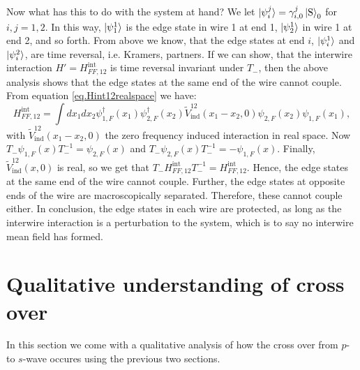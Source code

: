 Now what has this to do with the system at hand? We let $\ket{\psi_{i}^{j}} = \gamma_{i,0}^{j}\ket{\text{S}}_0$ for $i, j = 1, 2$. In this way, $\ket{\psi_{1}^1}$ is the edge state in wire 1 at end 1, $\ket{\psi_{2}^1}$ in wire 1 at end 2, and so forth. From above we know, that the edge states at end $i$, $\ket{\psi_{i}^1}$ and $\ket{\psi_{i}^2}$, are time reversal, i.e. Kramers, partners. If we can show, that the interwire interaction $H' = H^\text{int}_{FF,12}$ is time reversal invariant under $T_-$, then the above analysis shows that the edge states at the same end of the wire cannot couple. From equation \eqref{eq.Hint12realspace} we have:
\begin{equation}
H^\text{int}_{FF,12} = \int dx_1 dx_2 \psi^\dagger_{1,F}(x_1)\psi^\dagger_{2,F}(x_2) \tilde{V}_{\text{ind}}^{12}(x_1-x_2,0) \psi_{2,F}(x_2)\psi_{1,F}(x_1),
\end{equation}
with $\tilde{V}_{\text{ind}}^{12}(x_1-x_2,0)$ the zero frequency induced interaction in real space. Now $T_-\psi_{1,F}(x)T^{-1}_- = \psi_{2,F}(x)$ and $T_-\psi_{2,F}(x)T^{-1}_- = -\psi_{1,F}(x)$. Finally, $\tilde{V}_{\text{ind}}^{12}(x, 0)$ is real, so we get that $T_-H^\text{int}_{FF,12}T_-^{-1} = H^\text{int}_{FF,12}$. Hence, the edge states at the same end of the wire cannot couple. Further, the edge states at opposite ends of the wire are macroscopically separated. Therefore, these cannot couple either. In conclusion, the edge states in each wire are protected, as long as the interwire interaction is a perturbation to the system, which is to say no interwire mean field has formed.  

\section{Qualitative understanding of cross over}
\label{sec.2wirestransitionqualitative}
In this section we come with a qualitative analysis of how the cross over from $p$- to $s$-wave occures using the previous two sections. 

